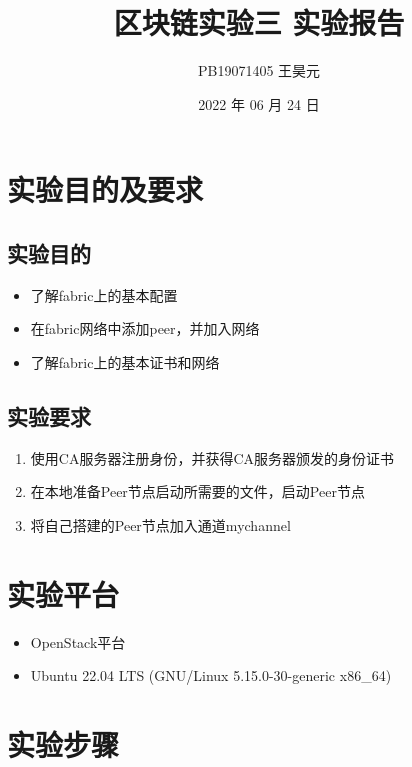 \documentclass{article}
\title{区块链实验三 实验报告}
\author{PB19071405 王昊元}
\date{2022 年 06 月 24 日}
\begin{document}
    \maketitle
    \section{实验目的及要求}
    \subsection{实验目的}
    \begin{itemize}
        \item 了解fabric上的基本配置
        \item 在fabric网络中添加peer，并加入网络
        \item 了解fabric上的基本证书和网络
    \end{itemize}
    \subsection{实验要求}
    \begin{enumerate}
        \item 使用CA服务器注册身份，并获得CA服务器颁发的身份证书
        \item 在本地准备Peer节点启动所需要的文件，启动Peer节点
        \item 将自己搭建的Peer节点加入通道mychannel
    \end{enumerate}
    \section{实验平台}
    \begin{itemize}
        \item OpenStack平台
        \item Ubuntu 22.04 LTS (GNU/Linux 5.15.0-30-generic x86\_64)
    \end{itemize}
    \section{实验步骤}
\end{document}

